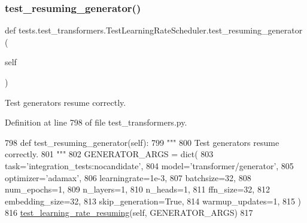\subsubsection{\texorpdfstring{test\+\_\+resuming\+\_\+generator()}{test\_resuming\_generator()}}
{\footnotesize\ttfamily def tests.\+test\+\_\+transformers.\+Test\+Learning\+Rate\+Scheduler.\+test\+\_\+resuming\+\_\+generator (\begin{DoxyParamCaption}\item[{}]{self }\end{DoxyParamCaption})}

\begin{DoxyVerb}Test generators resume correctly.
\end{DoxyVerb}
 

Definition at line 798 of file test\+\_\+transformers.\+py.


\begin{DoxyCode}
798     \textcolor{keyword}{def }test\_resuming\_generator(self):
799         \textcolor{stringliteral}{"""}
800 \textcolor{stringliteral}{        Test generators resume correctly.}
801 \textcolor{stringliteral}{        """}
802         GENERATOR\_ARGS = dict(
803             task=\textcolor{stringliteral}{'integration\_tests:nocandidate'},
804             model=\textcolor{stringliteral}{'transformer/generator'},
805             optimizer=\textcolor{stringliteral}{'adamax'},
806             learningrate=1e-3,
807             batchsize=32,
808             num\_epochs=1,
809             n\_layers=1,
810             n\_heads=1,
811             ffn\_size=32,
812             embedding\_size=32,
813             skip\_generation=\textcolor{keyword}{True},
814             warmup\_updates=1,
815         )
816         \hyperlink{namespacetests_1_1test__transformers_a8d6cf0022229f5deba37f23f30601117}{test\_learning\_rate\_resuming}(self, GENERATOR\_ARGS)
817 
\end{DoxyCode}
\mbox{\label{classtests_1_1test__transformers_1_1TestLearningRateScheduler_a1f6f7d394258d2170c3005e6dffae8a7}} 
